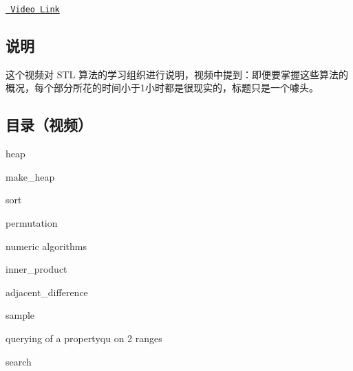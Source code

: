 \href{https://www.bilibili.com/video/av46316166?from=search&seid=16850541774524193645}{\texttt{ Video Link}}

\subsection*{说明}

这个视频对 S\+TL 算法的学习组织进行说明，视频中提到：即便要掌握这些算法的概况，每个部分所花的时间小于1小时都是很现实的，标题只是一个噱头。 \subsection*{目录（视频）}


\begin{DoxyItemize}
\item heap
\begin{DoxyItemize}
\item make\+\_\+heap
\end{DoxyItemize}
\item sort
\item permutation
\item numeric algorithms
\begin{DoxyItemize}
\item inner\+\_\+product
\item adjacent\+\_\+difference
\item sample
\end{DoxyItemize}
\item querying of a propertyqu on 2 ranges
\item search 
\end{DoxyItemize}